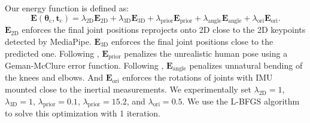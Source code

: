 %
%
Our energy function is defined as:
\begin{equation}
\boldsymbol{E}(\boldsymbol{\theta}_{\mathrm{c}},\boldsymbol{t}_{\mathrm{c}})=\lambda_{\mathrm{2D}}\boldsymbol{E}_{\mathrm{2D}}+\lambda_{\mathrm{3D}}\boldsymbol{E}_{\mathrm{3D}}+\lambda_{\mathrm{prior}}\boldsymbol{E}_{\mathrm{prior}}+\lambda_{\mathrm{angle}}\boldsymbol{E}_{\mathrm{angle}}+\lambda_{\mathrm{ori}}\boldsymbol{E}_{\mathrm{ori}}.
\end{equation}
%
$\boldsymbol{E}_{\mathrm{2D}}$ enforces the final joint positions reprojects onto 2D close to the 2D keypoints detected by MediaPipe. %
%
$\boldsymbol{E}_{\mathrm{3D}}$ enforces the final joint positions close to the predicted one.
%
Following \cite{smplify}, $\boldsymbol{E}_{\mathrm{prior}}$ penalizes the unrealistic human pose using a Geman-McClure \cite{geman-mcclure} error function.
%
Following \cite{smplify}, $\boldsymbol{E}_{\mathrm{angle}}$ penalizes unnatural bending of the knees and elbows.
%
And $\boldsymbol{E}_{\mathrm{ori}}$ enforces the rotations of joints with IMU mounted close to the inertial measurements.
%
We experimentally set $\lambda_{\mathrm{2D}}=1$, $\lambda_{\mathrm{3D}}=1$, $\lambda_{\mathrm{prior}}=0.1$, $\lambda_{\mathrm{prior}}=15.2$, and $\lambda_{\mathrm{ori}}=0.5$.
%
We use the L-BFGS \cite{lbfgs} algorithm to solve this optimization with 1 iteration.
%

%
